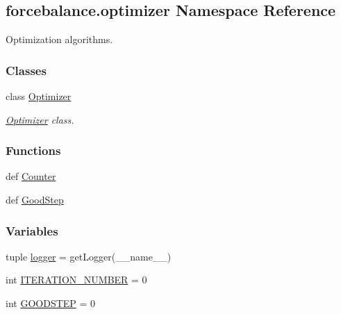 \hypertarget{namespaceforcebalance_1_1optimizer}{\subsection{forcebalance.\-optimizer Namespace Reference}
\label{namespaceforcebalance_1_1optimizer}
}


Optimization algorithms.  


\subsubsection*{Classes}
\begin{DoxyCompactItemize}
\item 
class \hyperlink{classforcebalance_1_1optimizer_1_1Optimizer}{Optimizer}
\begin{DoxyCompactList}\small\item\em \hyperlink{classforcebalance_1_1optimizer_1_1Optimizer}{Optimizer} class. \end{DoxyCompactList}\end{DoxyCompactItemize}
\subsubsection*{Functions}
\begin{DoxyCompactItemize}
\item 
def \hyperlink{namespaceforcebalance_1_1optimizer_ae1f6c649703a22b2f767a5f6bf53297b}{Counter}
\item 
def \hyperlink{namespaceforcebalance_1_1optimizer_ab43948ecf30c90d319e0c0b107fe484a}{Good\-Step}
\end{DoxyCompactItemize}
\subsubsection*{Variables}
\begin{DoxyCompactItemize}
\item 
tuple \hyperlink{namespaceforcebalance_1_1optimizer_a8c7d22696df2debf02ce9e3bb35349fd}{logger} = get\-Logger(\-\_\-\-\_\-name\-\_\-\-\_\-)
\item 
int \hyperlink{namespaceforcebalance_1_1optimizer_ac3e728fa9f2dacdcca7e1b51d9f2a49e}{I\-T\-E\-R\-A\-T\-I\-O\-N\-\_\-\-N\-U\-M\-B\-E\-R} = 0
\item 
int \hyperlink{namespaceforcebalance_1_1optimizer_a7b0cf561a0ec911ee4b217cb0b05a28e}{G\-O\-O\-D\-S\-T\-E\-P} = 0
\end{DoxyCompactItemize}



